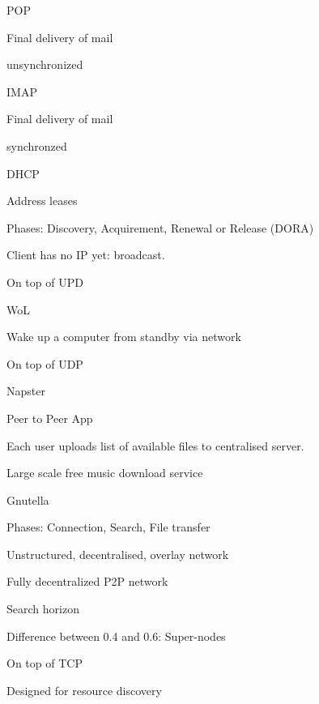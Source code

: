 \documentclass[main.tex]{subfiles}
\begin{document}
\begin{card}{POP}
\item Final delivery of mail
\item unsynchronized
\end{card}

\begin{card}{IMAP}
\item Final delivery of mail
\item synchronzed
\end{card}

\begin{card}{DHCP}
\item Address leases
\item Phases: Discovery, Acquirement, Renewal or Release (DORA)
\item Client has no IP yet: broadcast.
\item On top of UPD
\end{card}

\begin{card}{WoL}
\item Wake up a computer from standby via network
\item On top of UDP
\end{card}

\begin{card}{Napster}
\item Peer to Peer App
\item Each user uploads list of available files to centralised server.
\item Large scale free music download service
\end{card}


\begin{card}{Gnutella}
\item Phases: Connection, Search, File transfer
\item Unstructured, decentralised, overlay network
\item Fully decentralized P2P network
\item Search horizon
\item Difference between 0.4 and 0.6: Super-nodes
\item On top of TCP
\item Designed for resource discovery
\end{card}
\end{document}
